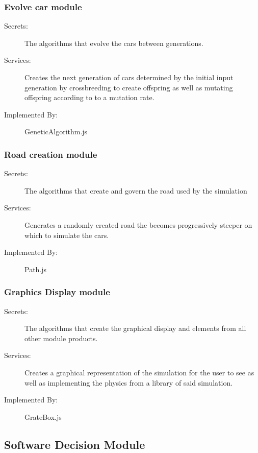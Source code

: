 \documentclass[12pt, titlepage]{article}
\begin{document}
\subsubsection{Evolve car module}

\begin{description}
\item[Secrets:] The algorithms that evolve the cars between generations.
\item[Services:] Creates the next generation of cars determined by the initial 
input generation by crossbreeding to create offspring as well as mutating 
offspring according to to a mutation rate.
\item[Implemented By:] \color{RoyalPurple}GeneticAlgorithm.js
\end{description}

\subsubsection{Road creation module}

\begin{description}
\item[Secrets:] The algorithms that create and govern the road used by the 
simulation
\item[Services:] Generates a randomly created road the becomes progressively 
steeper on which to simulate the cars.
\item[Implemented By:] \color{RoyalPurple}Path.js
\end{description}

\subsubsection{Graphics Display module}

\begin{description}
\item[Secrets:] The algorithms that create the graphical display and elements 
from all other module products.
\item[Services:] Creates a graphical representation of the simulation for the 
user to see as well as implementing the physics from a library of said 
simulation.
\item[Implemented By:] \color{RoyalPurple}GrateBox.js
\end{description}

\subsection{Software Decision Module}
\end{document}
